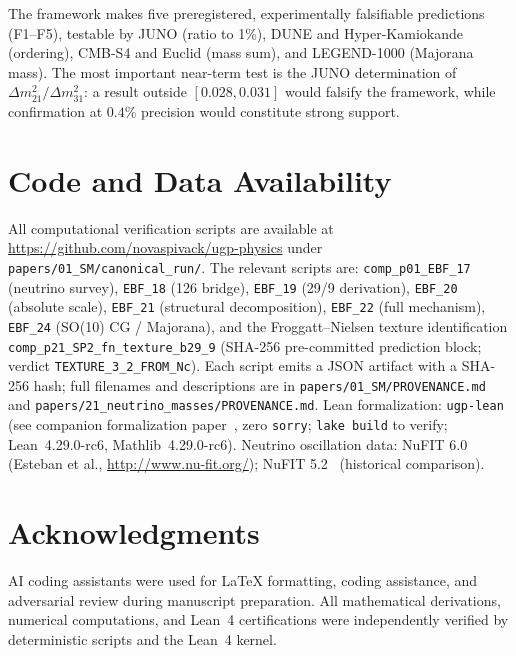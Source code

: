 \documentclass[12pt,a4paper]{article}
\theoremstyle{definition}
\theoremstyle{remark}
\begin{document}
The framework makes five preregistered, experimentally falsifiable
predictions (F1--F5), testable by JUNO (ratio to 1\%), DUNE and
Hyper-Kamiokande (ordering), CMB-S4 and Euclid (mass sum), and
LEGEND-1000 (Majorana mass).
The most important near-term test is the JUNO determination of
$\Delta m^2_{21}/\Delta m^2_{31}$: a result outside $[0.028, 0.031]$
would falsify the framework, while confirmation at $0.4\%$ precision
would constitute strong support.

\section*{Code and Data Availability}
All computational verification scripts are available at
\url{https://github.com/novaspivack/ugp-physics} under
\texttt{papers/01\_SM/\allowbreak{}canonical\_run/}.  The relevant scripts are:
\texttt{comp\_p01\_\allowbreak{}EBF\_17} (neutrino survey),
\texttt{EBF\_18} (126 bridge),
\texttt{EBF\_19} (29/9 derivation),
\texttt{EBF\_20} (absolute scale),
\texttt{EBF\_21} (structural decomposition),
\texttt{EBF\_22} (full mechanism),
\texttt{EBF\_24} (SO(10) CG / Majorana),
and the Froggatt--Nielsen texture identification
\texttt{comp\_p21\_\allowbreak{}SP2\_\allowbreak{}fn\_\allowbreak{}texture\_\allowbreak{}b29\_9}
(SHA-256 pre-committed prediction block; verdict \texttt{TEXTURE\_3\_2\_FROM\_Nc}).
Each script emits a JSON artifact with a SHA-256 hash;
full filenames and descriptions are in \texttt{papers/01\_SM/PROVENANCE.md}
and \texttt{papers/21\_neutrino\_masses/PROVENANCE.md}.
Lean formalization: \texttt{ugp-lean}~\cite{ugp-lean,SpivackUGPFormalization}
(see companion formalization paper~\cite{SpivackUGPFormalization},
zero \texttt{sorry}; \texttt{lake build} to verify;
Lean~4.29.0-rc6, Mathlib~4.29.0-rc6).
Neutrino oscillation data: NuFIT 6.0~\cite{NuFIT60} (Esteban et al., \url{http://www.nu-fit.org/}); NuFIT 5.2~\cite{NuFIT52} (historical comparison).

\section*{Acknowledgments}

AI coding assistants were used for LaTeX formatting, coding assistance, and adversarial review during manuscript preparation. All mathematical derivations, numerical computations, and Lean~4 certifications were independently verified by deterministic scripts and the Lean~4 kernel.



\end{document}
